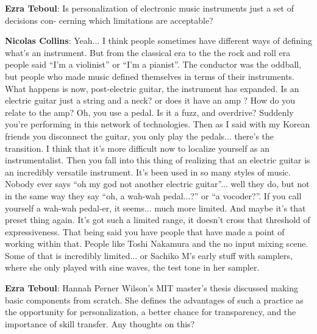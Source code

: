 \textbf{Ezra Teboul}: Is personalization of electronic music instruments just a set of decisions con- cerning which limitations are acceptable?
					
\textbf{Nicolas Collins}: Yeah... I think people sometimes have different ways of defining what’s an instrument. But from the classical era to the the rock and roll era people said ``I’m a violinist'' or ``I’m a pianist''. The conductor was the oddball, but people who made music defined themselves in terms of their instruments. What happens is now, post-electric guitar, the instrument has expanded. Is an electric guitar just a string and a neck? or does it have an amp ? How do you relate to the amp? Oh, you use a pedal. Is it a fuzz, and overdrive? Suddenly you’re performing in this network of technologies. Then as I said with my Korean friends you disconnect the guitar, you only play the pedals... there’s the transition. I think that it’s more difficult now to localize yourself as an instrumentalist. Then you fall into this thing of realizing that an electric guitar is an incredibly versatile instrument. It’s been used in so many styles of music. Nobody ever says ``oh my god not another electric guitar''... well they do, but not in the same way they say ``oh, a wah-wah pedal...?'' or ``a vocoder?''. If you call yourself a wah-wah pedal-er, it seems... much more limited. And maybe it’s that preset thing again. It’s got such a limited range, it doesn’t cross that threshold of expressiveness. That being said you have people that have made a point of working within that. People like Toshi Nakamura and the no input mixing scene. Some of that is incredibly limited... or Sachiko M’s early stuff with samplers, where she only played with sine waves, the test tone in her sampler.
					
\textbf{Ezra Teboul}: Hannah Perner Wilson’s MIT master’s thesis discussed making basic components from scratch. She defines the advantages of such a practice as the opportunity for personalization, a better chance for transparency, and the importance of skill transfer. Any thoughts on this?
					
